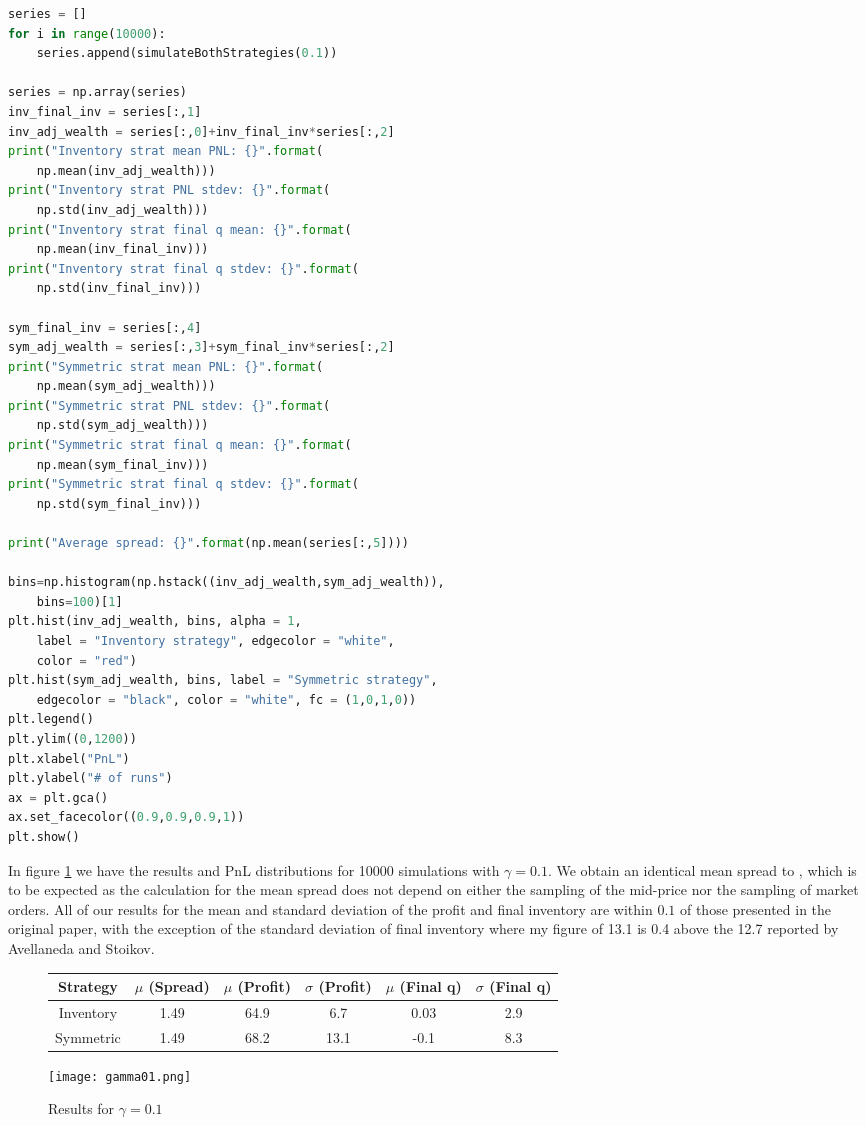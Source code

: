 \begin{lstlisting}[language=Python, caption=run-simulations]
series = []
for i in range(10000):
    series.append(simulateBothStrategies(0.1))

series = np.array(series)
inv_final_inv = series[:,1]
inv_adj_wealth = series[:,0]+inv_final_inv*series[:,2]
print("Inventory strat mean PNL: {}".format(
    np.mean(inv_adj_wealth)))
print("Inventory strat PNL stdev: {}".format(
    np.std(inv_adj_wealth)))
print("Inventory strat final q mean: {}".format(
    np.mean(inv_final_inv)))
print("Inventory strat final q stdev: {}".format(
    np.std(inv_final_inv)))

sym_final_inv = series[:,4]
sym_adj_wealth = series[:,3]+sym_final_inv*series[:,2]
print("Symmetric strat mean PNL: {}".format(
    np.mean(sym_adj_wealth)))
print("Symmetric strat PNL stdev: {}".format(
    np.std(sym_adj_wealth)))
print("Symmetric strat final q mean: {}".format(
    np.mean(sym_final_inv)))
print("Symmetric strat final q stdev: {}".format(
    np.std(sym_final_inv)))

print("Average spread: {}".format(np.mean(series[:,5])))

bins=np.histogram(np.hstack((inv_adj_wealth,sym_adj_wealth)), 
    bins=100)[1] 
plt.hist(inv_adj_wealth, bins, alpha = 1, 
    label = "Inventory strategy", edgecolor = "white", 
    color = "red")
plt.hist(sym_adj_wealth, bins, label = "Symmetric strategy", 
    edgecolor = "black", color = "white", fc = (1,0,1,0))
plt.legend()
plt.ylim((0,1200))
plt.xlabel("PnL")
plt.ylabel("# of runs")
ax = plt.gca()
ax.set_facecolor((0.9,0.9,0.9,1))
plt.show()
\end{lstlisting}

In figure \ref{fig:results-gamma01} we have the results and PnL 
distributions for 10000 simulations with $\gamma=0.1$. We obtain 
an identical mean spread to \cite{AS2008}, which is to be expected
as the calculation for the mean spread does not depend on either 
the sampling of the mid-price nor the sampling of market orders.
All of our results for the mean and standard deviation of the profit
and final inventory are within $0.1$ of those presented in the original
paper, with the exception of the standard deviation of final inventory 
where my figure of 13.1 is 0.4 above the 12.7 reported by Avellaneda
and Stoikov.

\begin{figure}[ht!]
    \centering
        \begin{tabular}{ c c c c c c } 
            \hline
            Strategy & $\mu$ (Spread) & $\mu$ (Profit) & $\sigma$ (Profit) & $\mu$ (Final q) & $\sigma$ (Final q) \\  
            \hline
            Inventory & 1.49 & 64.9 & 6.7 & 0.03 & 2.9 \\
            Symmetric & 1.49 & 68.2 & 13.1 & -0.1 & 8.3 \\
            \hline
        \end{tabular}
        \texttt{[image: gamma01.png]}
        \caption{Results for $\gamma=0.1$}
        \label{fig:results-gamma01}
\end{figure}

